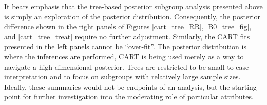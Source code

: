 \documentclass[aoas,preprint, 11pt, dvipsnames, table, x11name]{imsart}
\renewcommand{\bm}[1]{\mathbf{#1}}
\theoremstyle{remark}
\begin{document}
	It bears emphasis that the tree-based posterior subgroup analysis presented above is simply an exploration of the posterior distribution. Consequently, the posterior difference shown in the right panels of Figures \ref{cart_tree_RR}, \ref{B0_tree_fig}, and \ref{cart_tree_treat} require no further adjustment. Similarly, the CART fits presented in the left panels cannot be ``over-fit''. The posterior distribution is where the inferences are performed, CART is being used merely as a way to navigate a high dimensional posterior. Trees are restricted to be small to ease interpretation and to focus on subgroups with relatively large sample sizes. Ideally, these summaries would not be endpoints of an analysis, but the starting point for further investigation into the moderating role of particular attributes.
	
	
	
	
	
	
\end{document}

